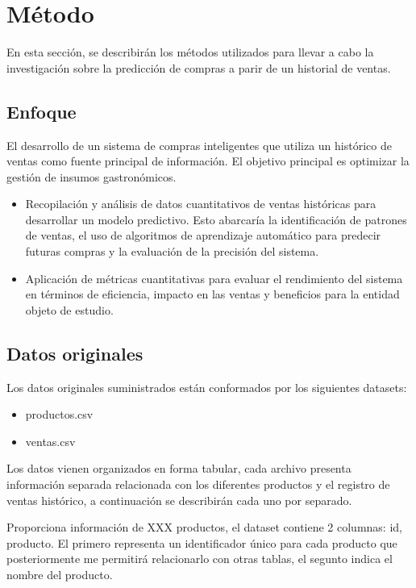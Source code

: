 \fancyhead{}
\fancyfoot{}
\cfoot{\thepage}



\chapter{Método}
En esta sección, se describirán los métodos utilizados para llevar a cabo la investigación sobre la predicción de compras a parir de un historial de ventas.


\section{Enfoque}
El desarrollo de un sistema de compras inteligentes que utiliza un histórico de ventas como fuente principal de información. El objetivo principal es optimizar la gestión de insumos gastronómicos.

\begin{itemize}
\item Recopilación y análisis de datos cuantitativos de ventas históricas para desarrollar un modelo predictivo. Esto abarcaría la identificación de patrones de ventas, el uso de algoritmos de aprendizaje automático para predecir futuras compras y la evaluación de la precisión del sistema. 
\item Aplicación de métricas cuantitativas para evaluar el rendimiento del sistema en términos de eficiencia, impacto en las ventas y beneficios para la entidad objeto de estudio.

\end{itemize}

\section{Datos originales}
Los datos originales suministrados están conformados por los siguientes datasets: 
\begin{itemize}
  \item productos.csv 
  \item ventas.csv
\end{itemize}

Los datos vienen organizados en forma tabular, cada archivo presenta información separada relacionada con los diferentes productos y el registro de ventas histórico, a continuación se describirán cada uno por separado.

Proporciona información de XXX  productos, el dataset contiene 2 columnas: id, producto. El primero representa un identificador único para cada producto que posteriormente me permitirá relacionarlo con otras tablas, el segunto indica el nombre del producto.

